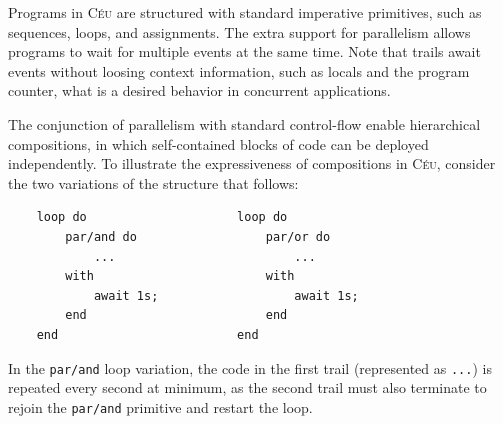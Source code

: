 \documentclass{sig-alternate}
\newcommand{\2}{\;\;}
\newcommand{\5}{\;\;\;\;\;}
\newcommand{\CEU}{\textsc{C\'{e}u}}
\newcommand{\code}[1] {{\small{\texttt{#1}}}}
\begin{document}

Programs in \CEU{} are structured with standard imperative primitives, such as 
sequences, loops, and assignments.
The extra support for parallelism allows programs to wait for multiple events 
at the same time.
Note that trails await events without loosing context information, such as 
locals and the program counter, what is a desired behavior in concurrent 
applications.~\cite{sync_async.cooperative}

The conjunction of parallelism with standard control-flow enable hierarchical 
compositions, in which self-contained blocks of code can be deployed 
independently.
To illustrate the expressiveness of compositions in \CEU{}, consider the two 
variations of the structure that follows:

{\small
\begin{verbatim}
    loop do                     loop do
        par/and do                  par/or do
            ...                         ...
        with                        with
            await 1s;                   await 1s;
        end                         end
    end                         end
\end{verbatim}
}

In the \code{par/and} loop variation, the code in the first trail (represented 
as \code{...}) is repeated every second at minimum, as the second trail must 
also terminate to rejoin the \code{par/and} primitive and restart the loop.
\end{document}
